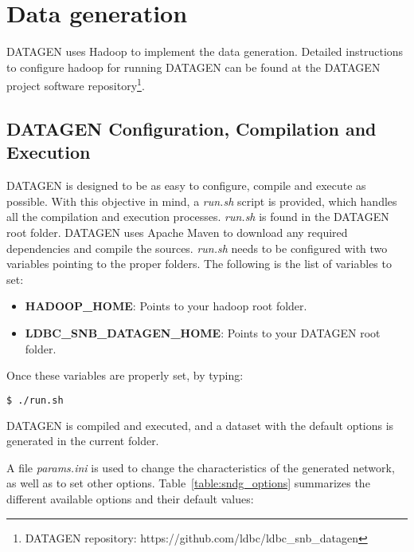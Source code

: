 \section{Data generation}\label{section:data_generation}

DATAGEN uses Hadoop to implement the data generation. Detailed instructions
to configure hadoop for running DATAGEN can be found at the DATAGEN project
software repository\footnote{ DATAGEN repository:
https://github.com/ldbc/ldbc\_snb\_datagen}. 

\subsection{DATAGEN Configuration, Compilation and Execution}

DATAGEN is designed to be as easy to configure, compile and execute as
possible. With this objective in mind, a \textit{run.sh} script is provided,
which handles all the compilation and execution processes.  \textit{run.sh}
is found in the DATAGEN root folder. DATAGEN uses Apache Maven to download any
required dependencies and compile the sources.  \textit{run.sh} needs to be
configured with two variables pointing to the proper folders. The following is
the list of variables to set:

\begin{itemize}
    \item \textbf{HADOOP\_HOME}: Points to your hadoop root folder.
    \item \textbf{LDBC\_SNB\_DATAGEN\_HOME}: Points to your DATAGEN root folder.
\end{itemize}

Once these variables are properly set, by typing:

\begin{lstlisting}[backgroundcolor=\color{gray}, frame=single, language=bash]
$ ./run.sh
\end{lstlisting}

DATAGEN is compiled and executed, and a dataset with the default options is
generated in the current folder.

A file \textit{params.ini} is used to change the characteristics of the
generated network, as well as to set other options. Table~\ref{table:sndg_options}
summarizes the different available options and their default values:

